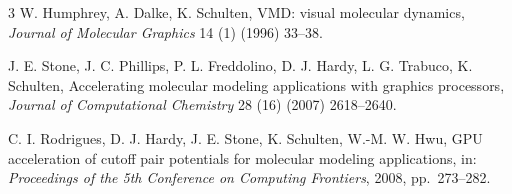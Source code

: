\begin{chapterbibliography}{3}
  W. Humphrey, A. Dalke, K. Schulten, VMD: visual molecular dynamics,
  \emph{Journal of Molecular Graphics} 14 (1) (1996) 33--38.

  J. E. Stone, J. C. Phillips, P. L. Freddolino, D. J. Hardy, L. G. Trabuco,
  K. Schulten, Accelerating molecular modeling applications with graphics processors,
  \emph{Journal of Computational Chemistry} 28 (16) (2007) 2618--2640.

  C. I. Rodrigues, D. J. Hardy, J. E. Stone, K. Schulten, W.-M. W. Hwu,
  GPU acceleration of cutoff pair potentials for molecular modeling applications,
  in: \emph{Proceedings of the 5th Conference on Computing Frontiers}, 2008, pp.~273--282.
\end{chapterbibliography}
